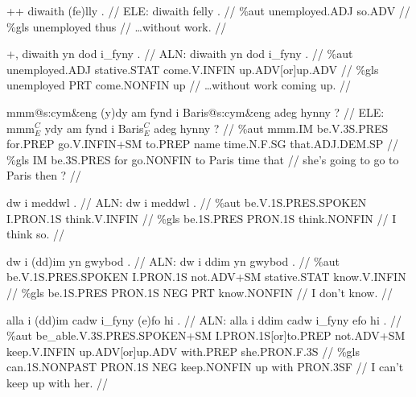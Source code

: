 \documentclass[a4paper,10pt]{article}
\begin{document}
\ex
\begingl[lingstyle=gergl]
\glchat ++ diwaith (fe)lly . //
\glsurface ELE:  diwaith felly .  //
\glauto \%aut  unemployed{\scriptsize .ADJ} so{\scriptsize .ADV}   //
\glmanual \%gls  unemployed thus   //
\gleng  \dots without work. //
\endgl
\xe

\ex
\begingl[lingstyle=gergl]
\glchat +, diwaith yn dod i\_fyny . //
\glsurface ALN:  diwaith yn dod i\_fyny .  //
\glauto \%aut  unemployed{\scriptsize .ADJ} stative{\scriptsize .STAT} come{\scriptsize .V.INFIN} up{\scriptsize .ADV[or]up.ADV}   //
\glmanual \%gls  unemployed PRT come{\scriptsize .NONFIN} up   //
\gleng  \dots without work coming up. //
\endgl
\xe

\ex
\begingl[lingstyle=gergl]
\glchat mmm@s:cym\&eng (y)dy am fynd i Baris@s:cym\&eng adeg hynny ? //
\glsurface ELE:  mmm$^{C}_{E}$ ydy am fynd i Baris$^{C}_{E}$ adeg hynny ?  //
\glauto \%aut  mmm{\scriptsize .IM} be{\scriptsize .V.3S.PRES} for{\scriptsize .PREP} go{\scriptsize .V.INFIN+SM} to{\scriptsize .PREP} name time{\scriptsize .N.F.SG} that{\scriptsize .ADJ.DEM.SP}   //
\glmanual \%gls  IM be{\scriptsize .3S.PRES} for go{\scriptsize .NONFIN} to Paris time that   //
\gleng she's going to go to Paris then ? //
\endgl
\xe

\ex
\begingl[lingstyle=gergl]
\glchat dw i meddwl . //
\glsurface ALN:  dw i meddwl .  //
\glauto \%aut  be{\scriptsize .V.1S.PRES.SPOKEN} I{\scriptsize .PRON.1S} think{\scriptsize .V.INFIN}   //
\glmanual \%gls  be{\scriptsize .1S.PRES} PRON{\scriptsize .1S} think{\scriptsize .NONFIN}   //
\gleng I think so. //
\endgl
\xe

\ex
\begingl[lingstyle=gergl]
\glchat dw i (dd)im yn gwybod . //
\glsurface ALN:  dw i ddim yn gwybod .  //
\glauto \%aut  be{\scriptsize .V.1S.PRES.SPOKEN} I{\scriptsize .PRON.1S} not{\scriptsize .ADV+SM} stative{\scriptsize .STAT} know{\scriptsize .V.INFIN}   //
\glmanual \%gls  be{\scriptsize .1S.PRES} PRON{\scriptsize .1S} NEG PRT know{\scriptsize .NONFIN}   //
\gleng I don't know. //
\endgl
\xe

\ex
\begingl[lingstyle=gergl]
\glchat alla i (dd)im cadw i\_fyny (e)fo hi . //
\glsurface ALN:  alla i ddim cadw i\_fyny efo hi .  //
\glauto \%aut  be\_able{\scriptsize .V.3S.PRES.SPOKEN+SM} I{\scriptsize .PRON.1S[or]to.PREP} not{\scriptsize .ADV+SM} keep{\scriptsize .V.INFIN} up{\scriptsize .ADV[or]up.ADV} with{\scriptsize .PREP} she{\scriptsize .PRON.F.3S}   //
\glmanual \%gls  can{\scriptsize .1S.NONPAST} PRON{\scriptsize .1S} NEG keep{\scriptsize .NONFIN} up with PRON{\scriptsize .3SF}   //
\gleng I can't keep up with her. //
\endgl
\xe
\end{document}
